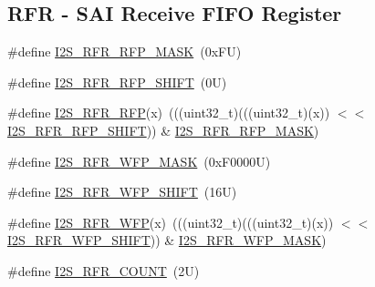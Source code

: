 \subsection*{R\+FR -\/ S\+AI Receive F\+I\+FO Register}
\begin{DoxyCompactItemize}
\item 
\#define \mbox{\hyperlink{group___i2_s___register___masks_ga47151099035d8d850a3fb194cdb35bb2}{I2\+S\+\_\+\+R\+F\+R\+\_\+\+R\+F\+P\+\_\+\+M\+A\+SK}}~(0x\+F\+U)
\item 
\#define \mbox{\hyperlink{group___i2_s___register___masks_ga7ffec4d33d58891c8388e1e85b206f58}{I2\+S\+\_\+\+R\+F\+R\+\_\+\+R\+F\+P\+\_\+\+S\+H\+I\+FT}}~(0\+U)
\item 
\#define \mbox{\hyperlink{group___i2_s___register___masks_ga48f5461338aaab9b151fa6e7272f3cdb}{I2\+S\+\_\+\+R\+F\+R\+\_\+\+R\+FP}}(x)~(((uint32\+\_\+t)(((uint32\+\_\+t)(x)) $<$$<$ \mbox{\hyperlink{group___i2_s___register___masks_ga7ffec4d33d58891c8388e1e85b206f58}{I2\+S\+\_\+\+R\+F\+R\+\_\+\+R\+F\+P\+\_\+\+S\+H\+I\+FT}})) \& \mbox{\hyperlink{group___i2_s___register___masks_ga47151099035d8d850a3fb194cdb35bb2}{I2\+S\+\_\+\+R\+F\+R\+\_\+\+R\+F\+P\+\_\+\+M\+A\+SK}})
\item 
\#define \mbox{\hyperlink{group___i2_s___register___masks_ga14ca8fb387a14c562c2721c054f25acc}{I2\+S\+\_\+\+R\+F\+R\+\_\+\+W\+F\+P\+\_\+\+M\+A\+SK}}~(0x\+F0000\+U)
\item 
\#define \mbox{\hyperlink{group___i2_s___register___masks_ga1890bc961298234e8516b19b4523bfb5}{I2\+S\+\_\+\+R\+F\+R\+\_\+\+W\+F\+P\+\_\+\+S\+H\+I\+FT}}~(16\+U)
\item 
\#define \mbox{\hyperlink{group___i2_s___register___masks_ga9f424cc6a0d2f577d7356b4abb83e43c}{I2\+S\+\_\+\+R\+F\+R\+\_\+\+W\+FP}}(x)~(((uint32\+\_\+t)(((uint32\+\_\+t)(x)) $<$$<$ \mbox{\hyperlink{group___i2_s___register___masks_ga1890bc961298234e8516b19b4523bfb5}{I2\+S\+\_\+\+R\+F\+R\+\_\+\+W\+F\+P\+\_\+\+S\+H\+I\+FT}})) \& \mbox{\hyperlink{group___i2_s___register___masks_ga14ca8fb387a14c562c2721c054f25acc}{I2\+S\+\_\+\+R\+F\+R\+\_\+\+W\+F\+P\+\_\+\+M\+A\+SK}})
\item 
\#define \mbox{\hyperlink{group___i2_s___register___masks_ga5f5ee3aee6e56a411048d23c72b907ee}{I2\+S\+\_\+\+R\+F\+R\+\_\+\+C\+O\+U\+NT}}~(2\+U)
\end{DoxyCompactItemize}
